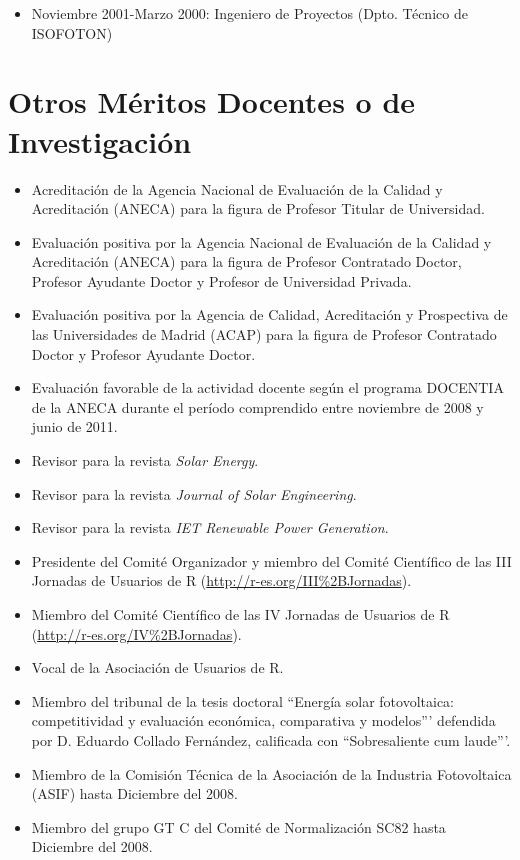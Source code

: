 \documentclass[article, a4paper]{memoir}
\begin{document}
\begin{itemize}
\item Noviembre 2001-Marzo 2000: Ingeniero de Proyectos (Dpto. Técnico
de ISOFOTON)
\end{itemize}


\section{Otros Méritos Docentes o de Investigación}
\label{sec-12}

\begin{itemize}
\item Acreditación de la Agencia Nacional de Evaluación de la Calidad y
Acreditación (ANECA) para la figura de Profesor Titular de
Universidad.

\item Evaluación positiva por la Agencia Nacional de Evaluación de la
Calidad y Acreditación (ANECA) para la figura de Profesor Contratado
Doctor, Profesor Ayudante Doctor y Profesor de Universidad Privada.

\item Evaluación positiva por la Agencia de Calidad, Acreditación y
Prospectiva de las Universidades de Madrid (ACAP) para la figura de
Profesor Contratado Doctor y Profesor Ayudante Doctor.

\item Evaluación favorable de la actividad docente según el programa
DOCENTIA de la ANECA durante el período comprendido entre noviembre
de 2008 y junio de 2011.

\item Revisor para la revista \emph{Solar Energy}.

\item Revisor para la revista \emph{Journal of Solar Engineering}.

\item Revisor para la revista \emph{IET Renewable Power Generation}.

\item Presidente del Comité Organizador y miembro del Comité Científico de
las III Jornadas de Usuarios de R (\url{http://r-es.org/III%2BJornadas}).

\item Miembro del Comité Científico de las IV Jornadas de Usuarios de
R (\url{http://r-es.org/IV%2BJornadas}).

\item Vocal de la Asociación de Usuarios de R.

\item Miembro del tribunal de la tesis doctoral ``Energía solar
fotovoltaica: competitividad y evaluación económica,
comparativa y modelos''' defendida por D. Eduardo Collado
Fernández, calificada con ``Sobresaliente cum laude'''.

\item Miembro de la Comisión Técnica de la Asociación de la Industria
Fotovoltaica (ASIF) hasta Diciembre del 2008.

\item Miembro del grupo GT C del Comité de Normalización SC82 hasta
Diciembre del 2008.
\end{itemize}
\end{document}
